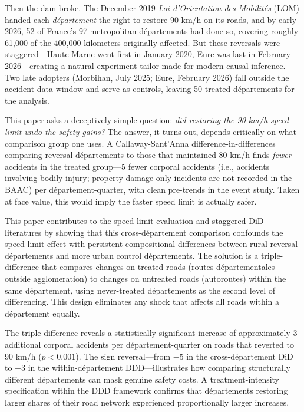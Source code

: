 \documentclass[12pt]{article}
\begin{document}
Then the dam broke. The December 2019 \textit{Loi d'Orientation des Mobilit\'{e}s} (LOM) handed each \textit{d\'{e}partement} the right to restore 90 km/h on its roads, and by early 2026, 52 of France's 97 metropolitan d\'{e}partements had done so, covering roughly 61,000 of the 400,000 kilometers originally affected. But these reversals were staggered---Haute-Marne went first in January 2020, Eure was last in February 2026---creating a natural experiment tailor-made for modern causal inference. Two late adopters (Morbihan, July 2025; Eure, February 2026) fall outside the accident data window and serve as controls, leaving 50 treated d\'{e}partements for the analysis.

This paper asks a deceptively simple question: \textit{did restoring the 90 km/h speed limit undo the safety gains?} The answer, it turns out, depends critically on what comparison group one uses. A Callaway-Sant'Anna difference-in-differences comparing reversal d\'{e}partements to those that maintained 80 km/h finds \textit{fewer} accidents in the treated group---5 fewer corporal accidents (i.e., accidents involving bodily injury; property-damage-only incidents are not recorded in the BAAC) per d\'{e}partement-quarter, with clean pre-trends in the event study. Taken at face value, this would imply the faster speed limit is actually safer.

This paper contributes to the speed-limit evaluation and staggered DiD literatures by showing that this cross-d\'{e}partement comparison confounds the speed-limit effect with persistent compositional differences between rural reversal d\'{e}partements and more urban control d\'{e}partements. The solution is a triple-difference that compares changes on treated roads (routes d\'{e}partementales outside agglomeration) to changes on untreated roads (autoroutes) within the same d\'{e}partement, using never-treated d\'{e}partements as the second level of differencing. This design eliminates any shock that affects all roads within a d\'{e}partement equally.

The triple-difference reveals a statistically significant increase of approximately 3 additional corporal accidents per d\'{e}partement-quarter on roads that reverted to 90 km/h ($p < 0.001$). The sign reversal---from $-5$ in the cross-d\'{e}partement DiD to $+3$ in the within-d\'{e}partement DDD---illustrates how comparing structurally different d\'{e}partements can mask genuine safety costs. A treatment-intensity specification within the DDD framework confirms that d\'{e}partements restoring larger shares of their road network experienced proportionally larger increases.
\end{document}
